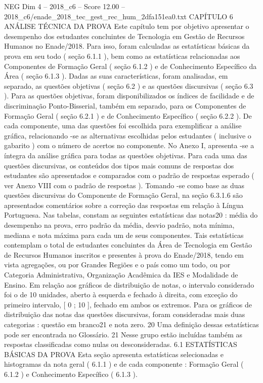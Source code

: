 \begin{textsample}{NEG Dim 4 – 2018\_c6 – Score 12.00 – 2018\_c6/enade\_2018\_tec\_gest\_rec\_hum\_2dfa151ea0.txt}  \label{ex:f4_neg_345}
CAPÍTULO 6 ANÁLISE TÉCNICA DA PROVA Este capítulo tem por objetivo apresentar o desempenho dos estudantes concluintes de Tecnologia em Gestão de Recursos Humanos no Enade/2018.
Para isso, foram calculadas as estatísticas básicas da prova em seu todo ( seção 6.1.1 ), bem como as estatísticas relacionadas aos Componentes de Formação Geral ( seção 6.1.2 ) e de Conhecimento Específico da Área ( seção 6.1.3 ).
Dadas as suas características, foram analisadas, em separado, as questões objetivas ( seção 6.2 ) e as questões discursivas ( seção 6.3 ).
Para as questões objetivas, foram disponibilizados os índices de facilidade e de discriminação Ponto-Bisserial, também em separado, para os Componentes de Formação Geral ( seção 6.2.1 ) e de Conhecimento Específico ( seção 6.2.2 ).
De cada componente, uma das questões foi escolhida para exemplificar a análise gráfica, relacionando -se as alternativas escolhidas pelos estudantes ( inclusive o gabarito ) com o número de acertos no componente.
No Anexo I, apresenta -se a íntegra da análise gráfica para todas as questões objetivas.
Para cada uma das questões discursivas, os conteúdos dos tipos mais comuns de respostas dos estudantes são apresentados e comparados com o padrão de respostas esperado ( ver Anexo VIII com o padrão de respostas ).
Tomando -se como base as duas questões discursivas do Componente de Formação Geral, na seção 6.3.1.6 são apresentados comentários sobre a correção das respostas em relação à Língua Portuguesa.
Nas tabelas, constam as seguintes estatísticas das notas20 : média do desempenho na prova, erro padrão da média, desvio padrão, nota mínima, mediana e nota máxima para cada um de seus componentes.
Tais estatísticas contemplam o total de estudantes concluintes da Área de Tecnologia em Gestão de Recursos Humanos inscritos e presentes à prova do Enade/2018, tendo em vista agregações, ou por Grandes Regiões e o país como um todo, ou por Categoria Administrativa, Organização Acadêmica da IES e Modalidade de Ensino.
Em relação aos gráficos de distribuição de notas, o intervalo considerado foi o de 10 unidades, aberto à esquerda e fechado à direita, com exceção do primeiro intervalo, [ 0 ; 10 ], fechado em ambos os extremos.
Para os gráficos de distribuição das notas das questões discursivas, foram consideradas mais duas categorias : questão em branco21 e nota zero. 20 Uma definição dessas estatísticas pode ser encontrada no Glossário. 21 Nesse grupo estão incluídas também as respostas classificadas como nulas ou desconsideradas. 6.1 ESTATÍSTICAS BÁSICAS DA PROVA Esta seção apresenta estatísticas selecionadas e histogramas da nota geral ( 6.1.1 ) e de cada componente : Formação Geral ( 6.1.2 ) e Conhecimento Específico ( 6.1.3 ).

\end{textsample}
